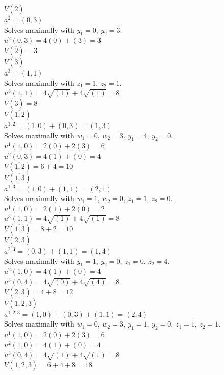 \documentclass{article}
\begin{document}
\begin{enumerate}
\begin{enumerate}
    $V(\overline{2})$ \\
    $a^{\overline{2}} = (0, 3)$ \\
    Solves maximally with $y_{1} = 0$, $y_{2} = 3$.  \\
    $u^{2}(0, 3) = 4(0) + (3) = 3$ \\
    $V(\overline{2}) = 3$ \\

    $V(\overline{3})$ \\
    $a^{\overline{3}} = (1, 1)$ \\
    Solves maximally with $z_{1} = 1$, $z_{2} = 1$.  \\
    $u^{3}(1, 1) = 4\sqrt{(1)} + 4\sqrt{(1)} = 8$ \\
    $V(\overline{3}) = 8$ \\

    $V(\overline{1, 2})$ \\
    $a^{\overline{1, 2}} = (1, 0) + (0, 3) = (1, 3)$ \\
    Solves maximally with $w_{1} = 0$, $w_{2} = 3$, $y_{1} = 4$, $y_{2} = 0$. \\
    $u^{1}(1, 0) = 2(0) + 2(3) = 6$ \\
    $u^{2}(0, 3) = 4(1) + (0) = 4$ \\
    $V(\overline{1, 2}) = 6 + 4 = 10$ \\

    $V(\overline{1, 3})$ \\
    $a^{\overline{1, 3}} = (1, 0) + (1, 1) = (2, 1)$ \\
    Solves maximally with $w_{1} = 1$, $w_{2} = 0$, $z_{1} = 1$, $z_{2} = 0$. \\
    $u^{1}(1, 0) = 2(1) + 2(0) = 2$ \\
    $u^{3}(1, 1) = 4\sqrt{(1)} + 4\sqrt{(1)} = 8$ \\
    $V(\overline{1, 3}) = 8 + 2 = 10$ \\

    $V(\overline{2, 3})$ \\
    $a^{\overline{2, 3}} = (0, 3) + (1, 1) = (1, 4)$ \\
    Solves maximally with $y_{1} = 1$, $y_{2} = 0$, $z_{1} = 0$, $z_{2} = 4$. \\
    $u^{2}(1, 0) = 4(1) + (0) = 4$ \\
    $u^{3}(0, 4) = 4\sqrt{(0)} + 4\sqrt{(4)} = 8$ \\
    $V(\overline{2, 3}) = 4 + 8 = 12$ \\

    $V(\overline{1, 2, 3})$ \\
    $a^{\overline{1, 2, 3}} = (1, 0) + (0, 3) + (1, 1) = (2, 4)$ \\
    Solves maximally with $w_{1} = 0$, $w_{2} = 3$, $y_{1} = 1$, $y_{2} = 0$, $z_{1} = 1$, $z_{2} = 1$. \\
    $u^{1}(1, 0) = 2(0) + 2(3) = 6$ \\
    $u^{2}(1, 0) = 4(1) + (0) = 4$ \\
    $u^{3}(0, 4) = 4\sqrt{(1)} + 4\sqrt{(1)} = 8$ \\
    $V(\overline{1, 2, 3}) = 6 + 4 + 8 = 18$ \\


\end{enumerate}
\end{enumerate}
\end{document}
